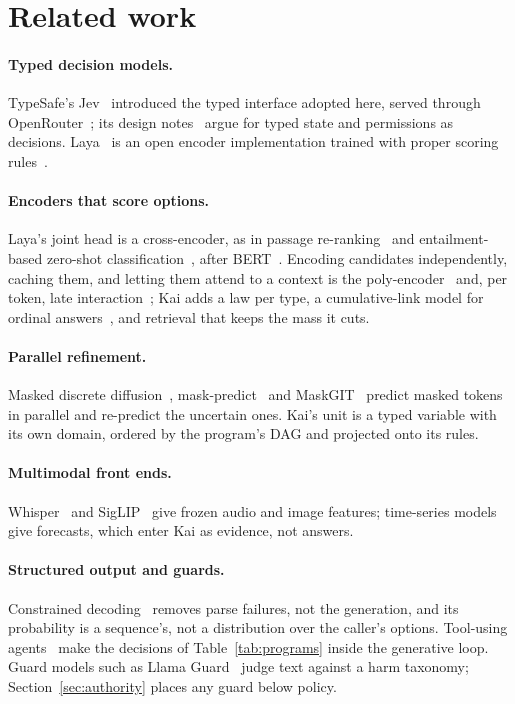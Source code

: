 \section{Related work}
\label{sec:related}

\paragraph{Typed decision models.}
TypeSafe's Jev~\cite{typesafejev} introduced the typed interface adopted
here, served through OpenRouter~\cite{openrouterdecisions}; its design
notes~\cite{jevnote} argue for typed state and permissions as decisions.
Laya~\cite{laya} is an open encoder implementation trained with proper scoring
rules~\cite{gneiting2007}.

\paragraph{Encoders that score options.}
Laya's joint head is a cross-encoder, as in passage
re-ranking~\cite{nogueira2019} and entailment-based zero-shot
classification~\cite{yin2019}, after BERT~\cite{devlin2019}. Encoding
candidates independently, caching them, and letting them attend to a context is
the poly-encoder~\cite{humeau2020poly} and, per token, late
interaction~\cite{khattab2020colbert}; Kai adds a law per type, a
cumulative-link model for ordinal answers~\cite{mccullagh1980}, and retrieval
that keeps the mass it cuts.

\paragraph{Parallel refinement.}
Masked discrete diffusion~\cite{austin2021d3pm},
mask-predict~\cite{ghazvininejad2019} and MaskGIT~\cite{chang2022maskgit}
predict masked tokens in parallel and re-predict the uncertain ones. Kai's unit
is a typed variable with its own domain, ordered by the program's DAG and
projected onto its rules.

\paragraph{Multimodal front ends.}
Whisper~\cite{radford2023whisper} and SigLIP~\cite{zhai2023siglip} give
frozen audio and image features; time-series
models~\cite{das2024timesfm,ansari2024chronos} give forecasts, which enter Kai
as evidence, not answers.

\paragraph{Structured output and guards.}
Constrained decoding~\cite{willard2023} removes parse failures, not the
generation, and its probability is a sequence's, not a distribution over the
caller's options. Tool-using agents~\cite{yao2023react,schick2023toolformer}
make the decisions of Table~\ref{tab:programs} inside the generative loop.
Guard models such as Llama Guard~\cite{inan2023llamaguard} judge text against
a harm taxonomy; Section~\ref{sec:authority} places any guard below policy.

